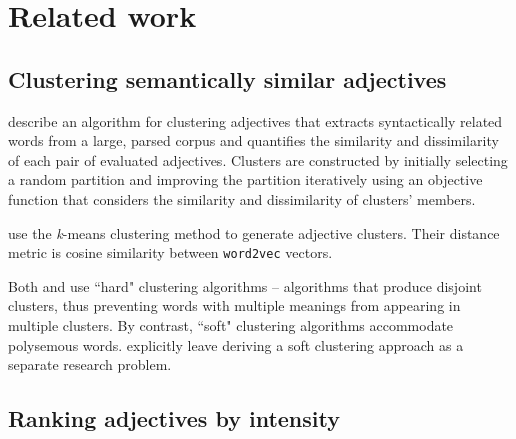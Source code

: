 \documentclass[11pt,a4paper]{article}
\begin{document}
\section{Related work}

\subsection{Clustering semantically similar adjectives}

 describe an algorithm for clustering adjectives that extracts syntactically related words from a large, parsed corpus and quantifies the similarity and dissimilarity of each pair of evaluated adjectives. Clusters are constructed by initially selecting a random partition and improving the partition iteratively using an objective function that considers the similarity and dissimilarity of clusters' members. 

 use the \textit{k}-means clustering method to generate adjective clusters. Their distance metric is cosine similarity between \texttt{word2vec} vectors. 

Both  and  use ``hard" clustering algorithms -- algorithms that produce disjoint clusters, thus preventing words with multiple meanings from appearing in multiple clusters. By contrast, ``soft" clustering algorithms accommodate polysemous words.  explicitly leave deriving a soft clustering approach as a separate research problem.

\subsection{Ranking adjectives by intensity}


\end{document}

